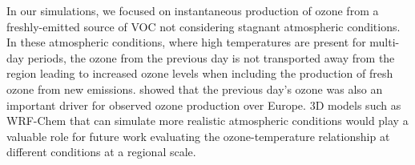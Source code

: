 In our simulations, we focused on instantaneous production of ozone from a freshly-emitted source of VOC not considering stagnant atmospheric conditions.
In these atmospheric conditions, where high temperatures are present for multi-day periods, the ozone from the previous day is not transported away from the region leading to increased ozone levels when including the production of fresh ozone from new emissions.  
\citet{Otero:2016} showed that the previous day's ozone was also an important driver for observed ozone production over Europe.
3D models such as WRF-Chem that can simulate more realistic atmospheric conditions would play a valuable role for future work evaluating the ozone-temperature relationship at different  conditions at a regional scale.
